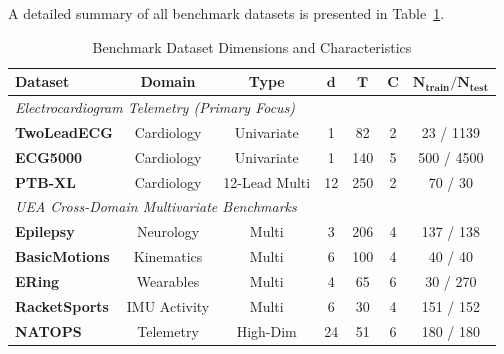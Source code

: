 \documentclass[conference]{IEEEtran}
\begin{document}
A detailed summary of all benchmark datasets is presented in Table~\ref{tab:dataset_properties}.

\begin{table}[!t]
\caption{Benchmark Dataset Dimensions and Characteristics}
\label{tab:dataset_properties}
\centering
\scriptsize
\setlength{\tabcolsep}{4.0pt}
\begin{tabular}{lcccccc}
\toprule
\textbf{Dataset} & \textbf{Domain} & \textbf{Type} & $\mathbf{d}$ & $\mathbf{T}$ & $\mathbf{C}$ & $\mathbf{N_{\text{train}} / N_{\text{test}}}$ \\
\midrule
\multicolumn{7}{l}{\textit{Electrocardiogram Telemetry (Primary Focus)}} \\
\textbf{TwoLeadECG} & Cardiology & Univariate & 1 & 82 & 2 & 23 / 1139 \\
\textbf{ECG5000} & Cardiology & Univariate & 1 & 140 & 5 & 500 / 4500 \\
\textbf{PTB-XL} & Cardiology & 12-Lead Multi & 12 & 250 & 2 & 70 / 30 \\
\midrule
\multicolumn{7}{l}{\textit{UEA Cross-Domain Multivariate Benchmarks}} \\
\textbf{Epilepsy} & Neurology & Multi & 3 & 206 & 4 & 137 / 138 \\
\textbf{BasicMotions} & Kinematics & Multi & 6 & 100 & 4 & 40 / 40 \\
\textbf{ERing} & Wearables & Multi & 4 & 65 & 6 & 30 / 270 \\
\textbf{RacketSports} & IMU Activity & Multi & 6 & 30 & 4 & 151 / 152 \\
\textbf{NATOPS} & Telemetry & High-Dim & 24 & 51 & 6 & 180 / 180 \\
\bottomrule
\end{tabular}
\end{table}
\end{document}
